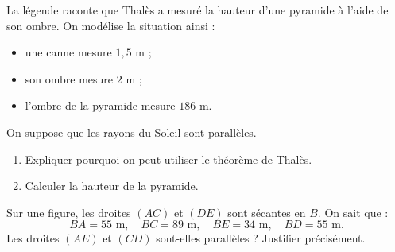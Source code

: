 \documentclass[a4paper,10pt]{report}
\begin{document}
\begin{ex}
La légende raconte que Thalès a mesuré la hauteur d'une pyramide à l'aide de son ombre.
On modélise la situation ainsi :
\begin{itemize}
\item une canne mesure $1,5$ m ;
\item son ombre mesure $2$ m ;
\item l'ombre de la pyramide mesure $186$ m.
\end{itemize}
On suppose que les rayons du Soleil sont parallèles.
\begin{enumerate}
\item Expliquer pourquoi on peut utiliser le théorème de Thalès.
\item Calculer la hauteur de la pyramide.
\end{enumerate}
\end{ex}

\begin{ex}
Sur une figure, les droites $(AC)$ et $(DE)$ sont sécantes en $B$.
On sait que :
\[
BA=55\text{ m},\quad BC=89\text{ m},\quad BE=34\text{ m},\quad BD=55\text{ m}.
\]
Les droites $(AE)$ et $(CD)$ sont-elles parallèles ? Justifier précisément.
\end{ex}
\end{document}
